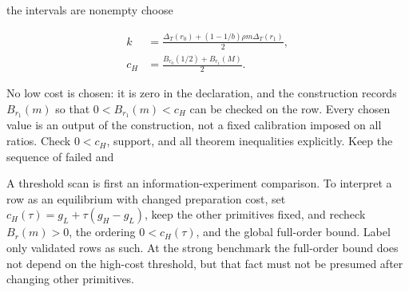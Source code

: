 the intervals are nonempty choose

\[
\begin{aligned}
k&=\frac{\Delta_T(r_0)+(1-1/b)\rho m\Delta_T(r_1)}2,\\
c_H&=\frac{B_{r_0}(1/2)+B_{r_1}(M)}2.
\end{aligned}
\tag{OA.78}\label{eq:oa-oa-78}
\]

No low cost is chosen: it is zero in the declaration, and the construction
records \(B_{r_1}(m)\) so that \(0<B_{r_1}(m)<c_H\) can be checked on the row.
Every chosen value is an output of the construction, not a fixed
calibration imposed on all ratios. Check \(0<c_H\), support, and all
theorem inequalities explicitly. Keep the sequence of failed and

A threshold scan is first an information-experiment comparison. To
interpret a row as an equilibrium with changed preparation cost, set
\(c_H(\tau)=g_L+\tau(g_H-g_L)\), keep the other primitives fixed, and
recheck \(B_r(m)>0\), the ordering \(0<c_H(\tau)\), and the global full-order bound.
Label only validated rows as such. At the strong benchmark the
full-order bound does not depend on the high-cost threshold, but that
fact must not be presumed after changing other primitives.


